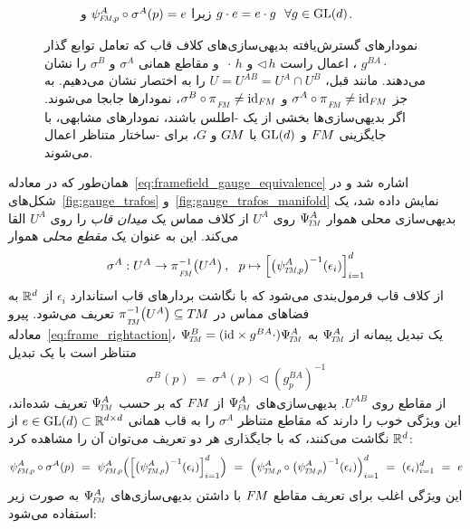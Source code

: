 \begin{figure}
\begin{subfigure}[b]{0.47\textwidth}
{			زیرا $\psiFMp^A\circ\sigma^A(p)=e$ و $g\cdot e=e\cdot g\ \ \forall g\in \operatorname{GL}(d)$.
		}
		\label{fig:trivialization_FM_section}
	\end{subfigure}
	\caption{\small
		نمودارهای گسترش‌یافته بدیهی‌سازی‌های کلاف قاب که تعامل توابع گذار $g^{BA}\cdot$ ، اعمال راست $\lhd\,h$ و $\,\cdot\,h$ و مقاطع همانی $\sigma^A$ و $\sigma^B$ را نشان می‌دهند.
		مانند قبل، $U=U^{AB}=U^A\cap U^B$ را به اختصار نشان می‌دهیم.
		به جز $\sigma^A\circ\piFM \neq \id_{\FM}$ و $\sigma^B\circ\piFM \neq \id_{\FM}$، نمودارها جابجا می‌شوند.
		اگر بدیهی‌سازی‌ها بخشی از یک -اطلس باشند، نمودارهای مشابهی، با جایگزینی $F\mkern-1.5muM$ و $\operatorname{GL}(d)$ با $G\mkern-1.4muM$ و $G$، برای -ساختار متناظر اعمال می‌شوند.
	}
	\label{fig:trivializations_FM_complete}
\end{figure}


همان‌طور که در معادله~\eqref{eq:framefield_gauge_equivalence} اشاره شد و در شکل‌های~\ref{fig:gauge_trafos} و~\ref{fig:gauge_trafos_manifold} نمایش داده شد، یک بدیهی‌سازی محلی هموار $\PsiTM^A$ روی $U^A$ از کلاف مماس یک \emph{میدان قاب} را روی $U^A$ القا می‌کند.
این به عنوان یک \emph{مقطع محلی} هموار
\begin{align}\label{eq:section_FM}
	\sigma^A:U^A\to \piFM^{-1}\!\left(U^A\right),\ \ p\mapsto \left[\big(\psiTMp^A\big)^{-1}(\epsilon_i)\right]_{i=1}^d
\end{align}
از کلاف قاب فرمول‌بندی می‌شود که با نگاشت بردارهای قاب استاندارد $\epsilon_i$ از $\mathbb{R}^d$ به فضاهای مماس در $\piTM^{-1}\big(U^A\big)\subseteq \TM$ تعریف می‌شود.
پیرو معادله~\ref{eq:frame_rightaction}، یک تبدیل پیمانه از $\PsiTM^A$ به $\PsiTM^B = (\id\times g^{BA}\cdot)\PsiTM^A$ متناظر است با یک تبدیل
\begin{align}\label{eq:section_FM_rightaction}
	\sigma^B(p)\ =\ \sigma^A(p) \lhd \left(g^{BA}_p\right)^{-1}
\end{align}
از مقاطع روی $U^{AB}$.
بدیهی‌سازی‌های $\PsiFM^A$ از $F\mkern-1.5muM$ که بر حسب $\PsiTM^A$ تعریف شده‌اند، این ویژگی خوب را دارند که مقاطع متناظر $\sigma^A$ را به قاب همانی $e \in \operatorname{GL}(d) \subset \mathbb{R}^{d\times d}$ از $\mathbb{R}^d$ نگاشت می‌کنند، که با جایگذاری هر دو تعریف می‌توان آن را مشاهده کرد:
\begin{align}\label{eq:identity_section_prop}
	\psiFMp^A\circ\sigma^A(p)
	\ =\ \psiFMp^A \Big(\Big[ \big(\psiTMp^A\big)^{-1} (\epsilon_i) \Big]_{i=1}^d \Big)
	\ =\ \Big(\psiTMp^A \circ \big(\psiTMp^A\big)^{-1} (\epsilon_i) \Big)_{i=1}^d
	\ =\ (\epsilon_i)_{i=1}^d
	\ =\ e
\end{align}
این ویژگی اغلب برای تعریف مقاطع $F\mkern-1.5muM$ با داشتن بدیهی‌سازی‌های $\PsiFM^A$ به صورت زیر استفاده می‌شود:
